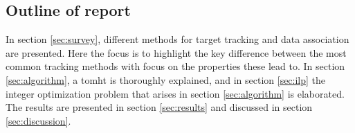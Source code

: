 \subsection{Outline of report}
In section \ref{sec:survey}, different methods for target tracking and data association are presented. Here the focus is to highlight the key difference between the most common tracking methods with focus on the properties these lead to. In section \ref{sec:algorithm}, a \gls{tomht} is thoroughly explained, and in section \ref{sec:ilp} the integer optimization problem that arises in section \ref{sec:algorithm} is elaborated. The results are presented in section \ref{sec:results} and discussed in section \ref{sec:discussion}.